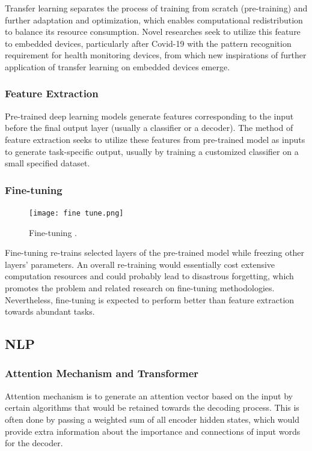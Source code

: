 \documentclass[a4paper]{article}
\begin{document}
Transfer learning separates the process of training from scratch (pre-training) and further adaptation and optimization, which enables computational redistribution to balance its resource consumption. Novel researches seek to utilize this feature to embedded devices, particularly after Covid-19 with the pattern recognition requirement for health monitoring devices, from which new inspirations of further application of transfer learning on embedded devices emerge.

\subsubsection{Feature Extraction}
Pre-trained deep learning models generate features corresponding to the input before the final output layer (usually a classifier or a decoder). The method of feature extraction seeks to utilize these features from pre-trained model as inputs to generate task-specific output, usually by training a customized classifier on a small specified dataset.

\subsubsection{Fine-tuning}
\begin{figure}[H]
    \centering
    \texttt{[image: fine tune.png]}
    \caption{Fine-tuning \cite{devlin2019bert}.}
\end{figure}
Fine-tuning re-trains selected layers of the pre-trained model while freezing other layers' parameters. An overall re-training would essentially cost extensive computation resources and could probably lead to disastrous forgetting, which promotes the problem and related research on fine-tuning methodologies. Nevertheless, fine-tuning is expected to perform better than feature extraction towards abundant tasks.

\subsection{NLP}
\subsubsection{Attention Mechanism and Transformer}
Attention mechanism is to generate an attention vector based on the input by certain algorithms that would be retained towards the decoding process. This is often done by passing a weighted sum of all encoder hidden states, which would provide extra information about the importance and connections of input words for the decoder.
\end{document}
